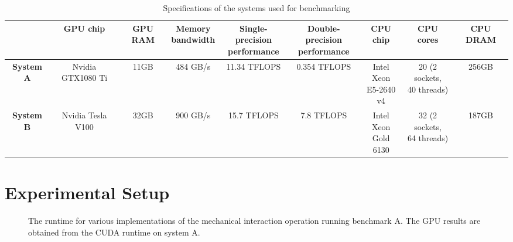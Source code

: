 \documentclass[conference]{IEEEtran}
\begin{document}
\begin{table*}[!t]
\caption{Specifications of the systems used for benchmarking}\label{tab:gpu-hardware}
\begin{center}
\begin{tabular}{|c|c|c|c|c|c|c|c|c|}
\hline
&\textbf{GPU chip} & \textbf{GPU RAM} & \makecell{\textbf{Memory} \\ \textbf{bandwidth}} & \makecell{\textbf{Single-precision} \\ \textbf{performance}} & \makecell{\textbf{Double-precision} \\ \textbf{performance}} & \textbf{CPU chip} & \textbf{CPU cores} & \textbf{CPU DRAM} \\
\hline
\textbf{System A} & Nvidia GTX1080 Ti & 11GB & 484 GB/s & 11.34 TFLOPS & 0.354 TFLOPS & \makecell{Intel Xeon\\ E5-2640 v4} & \makecell{20 (2 sockets, \\40 threads)} & 256GB \\
\hline
\textbf{System B} & Nvidia Tesla V100 & 32GB & 900 GB/s & 15.7 TFLOPS & 7.8 TFLOPS & \makecell{Intel Xeon\\ Gold 6130} & \makecell{32 (2 sockets, \\64 threads)} & 187GB \\
\hline
\end{tabular}
\label{tab1}
\end{center}
\end{table*}

\section{Experimental Setup} \label{sec:experimental_setup}

\begin{figure}[!t]
    \centering
    
    \caption{The runtime for various implementations of the mechanical interaction operation running benchmark A. The GPU results are obtained from the CUDA runtime on system A.}
    \label{fig:benchmarkA_runtimes}
\end{figure}
\end{document}
